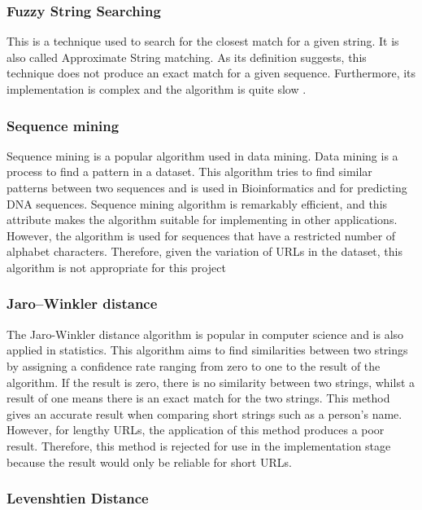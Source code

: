 \subsubsection{Fuzzy String Searching}
			
This is a technique used to search for the closest match for a given string. It is also called Approximate String matching. As its definition suggests, this technique does not produce an exact match for a given sequence. Furthermore, its implementation is complex and the algorithm is quite slow \cite{String-match}.

\subsubsection{Sequence mining}

Sequence mining is a popular algorithm used in data mining. Data mining is a process to find a pattern in a dataset. This algorithm tries to find similar patterns between two sequences and is used in Bioinformatics and for predicting DNA sequences. Sequence mining algorithm is remarkably efficient, and this attribute makes the algorithm suitable for implementing in other applications. However, the algorithm is used for sequences that have a restricted number of alphabet characters. Therefore, given the variation of URLs in the dataset, this algorithm is not appropriate for this project\cite{Sequence-mining}  

\subsubsection{Jaro–Winkler distance}

The Jaro-Winkler distance algorithm is popular in computer science and is also applied in statistics. This algorithm aims to find similarities between two strings by assigning a confidence rate ranging from zero to one to the result of the algorithm. If the result is zero, there is no similarity between two strings, whilst a result of one means there is an exact match for the two strings. This method gives an accurate result when comparing short strings such as a person’s name. However, for lengthy URLs, the application of this method produces a poor result. Therefore, this method is rejected for use in the implementation stage because the result would only be reliable for short URLs\cite{Jargo-winkle}. 

\subsubsection{Levenshtien Distance}
	

